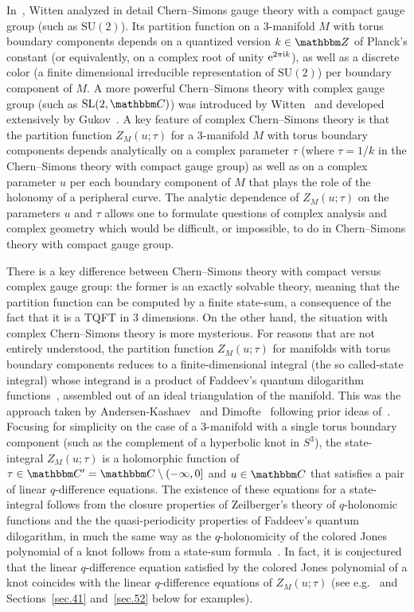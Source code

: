 \documentclass[12pt,reqno]{amsart}
\theoremstyle{definition}
\def\BZ{\mathbbm Z}
\def\BC{\mathbbm C}
\def\SL{\mathrm{SL}}
\def\ri{\mathrm{i}}
\def\re{{\rm e}}
\def\ri{{\rm i}}
\begin{document}
In~\cite{witten-jones}, Witten analyzed in detail Chern--Simons gauge
theory with a compact gauge group (such as $\mathrm{SU}(2)$). Its
partition function on a 3-manifold $M$ with torus boundary components
depends on a quantized version $k \in \BZ$ of Planck's constant (or
equivalently, on a complex root of unity $\re^{2\pi \ri k}$), as well
as a discrete color (a finite dimensional irreducible representation
of $\mathrm{SU}(2)$) per boundary component of $M$. A more powerful
Chern--Simons theory with complex gauge group (such as $\SL(2,\BC)$)
was introduced by Witten~\cite{witten:complexCS} and developed
extensively by Gukov~\cite{gukov}.  A key feature of complex
Chern--Simons theory is that the partition function $Z_M(u;\tau)$ for
a 3-manifold $M$ with torus boundary components depends analytically
on a complex parameter $\tau$ (where $\tau=1/k$ in the Chern--Simons
theory with compact gauge group) as well as on a complex parameter $u$
per each boundary component of $M$ that plays the role of the holonomy
of a peripheral curve.  The analytic dependence of $Z_M(u;\tau)$ on
the parameters $u$ and $\tau$ allows one to formulate questions of
complex analysis and complex geometry which would be difficult, or
impossible, to do in Chern--Simons theory with compact gauge group.

There is a key difference between Chern--Simons theory with compact
versus complex gauge group: the former is an exactly solvable theory,
meaning that the partition function can be computed by a finite
state-sum, a consequence of the fact that it is a TQFT in 3
dimensions.  On the other hand, the situation with complex
Chern--Simons theory is more mysterious. For reasons that are not
entirely understood, the partition function $Z_M(u;\tau)$ for
manifolds with torus boundary components reduces to a
finite-dimensional integral (the so called-state integral) whose
integrand is a product of Faddeev's quantum dilogarithm
functions~\cite{Faddeev}, assembled out of an ideal triangulation of
the manifold. This was the approach taken by
Andersen-Kashaev~\cite{AK, AK-review} and Dimofte~\cite{dimofte-rev}
following prior ideas of~\cite{Hikami,DGLZ}. Focusing for simplicity
on the case of a 3-manifold with a single torus boundary component
(such as the complement of a hyperbolic knot in $S^3$), the
state-integral $Z_M(u;\tau)$ is a holomorphic function of
$\tau \in \BC'=\BC\setminus (-\infty,0]$ and 
$u \in \BC$ that satisfies a pair of linear $q$-difference equations.
The existence of these equations for a state-integral follows from the
closure properties of Zeilberger's theory of $q$-holonomic functions
and the the quasi-periodicity properties of Faddeev's quantum
dilogarithm, in much the same way as the $q$-holonomicity of the
colored Jones polynomial of a knot follows from a state-sum
formula~\cite{GL}. In fact, it is conjectured that the linear
$q$-difference equation satisfied by the colored Jones polynomial of a
knot coincides with the linear $q$-difference equations of
$Z_M(u;\tau)$ (see e.g.~\cite{AM} and Sections~\ref{sec.41}
and~\ref{sec.52} below for examples).
\end{document}
